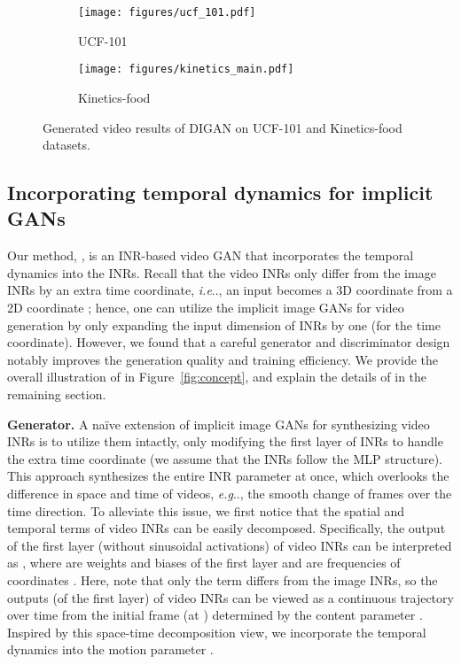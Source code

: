 \documentclass{article} \usepackage{iclr2022_conference,times}
\makeatletter
\DeclareRobustCommand\onedot{\futurelet\@let@token\@onedot}
\def\@onedot{\ifx\@let@token.\else.\null\fi\xspace}
\def\eg{\emph{e.g}\onedot} \def\Eg{\emph{E.g}\onedot}
\def\ie{\emph{i.e}\onedot} \def\Ie{\emph{I.e}\onedot}
\makeatother
\begin{document}
\begin{figure*}[t]
\centering\small
\begin{subfigure}{\textwidth}
\centering
\texttt{[image: figures/ucf\_101.pdf]}
\caption{UCF-101} 
\end{subfigure}
\begin{subfigure}{\textwidth}
\centering
\texttt{[image: figures/kinetics\_main.pdf]}
\caption{Kinetics-food} 
\end{subfigure}
\caption{
Generated video results of DIGAN on UCF-101 and Kinetics-food datasets.
}\label{fig:main}
\vspace{-0.15in}
\end{figure*}



 
\subsection{Incorporating temporal dynamics for implicit GANs}
\label{subsec:method-ours}

Our method, \sname, is an INR-based video GAN that incorporates the temporal dynamics into the INRs. Recall that the video INRs only differ from the image INRs by an extra time coordinate, \ie, an input becomes a 3D coordinate  from a 2D coordinate ; hence, one can utilize the implicit image GANs for video generation by only expanding the input dimension of INRs by one (for the time coordinate). However, we found that a careful generator and discriminator design notably improves the generation quality and training efficiency. We provide the overall illustration of \sname in Figure~\ref{fig:concept}, and explain the details of \sname in the remaining section.


\textbf{Generator.}
A na\"ive extension of implicit image GANs for synthesizing video INRs  is to utilize them intactly, only modifying the first layer of INRs to handle the extra time coordinate (we assume that the INRs follow the MLP structure). This approach synthesizes the entire INR parameter  at once, which overlooks the difference in space and time of videos, \eg, the smooth change of frames over the time direction. To alleviate this issue, we first notice that the spatial and temporal terms of video INRs can be easily decomposed. Specifically, the output of the first layer (without sinusoidal activations) of video INRs can be interpreted as , where  are weights and biases of the first layer and  are frequencies of coordinates . Here, note that only the term  differs from the image INRs, so the outputs (of the first layer) of video INRs can be viewed as a continuous trajectory over time  from the initial frame (at ) determined by the content parameter . Inspired by this space-time decomposition view, we incorporate the temporal dynamics into the motion parameter .
\end{document}
